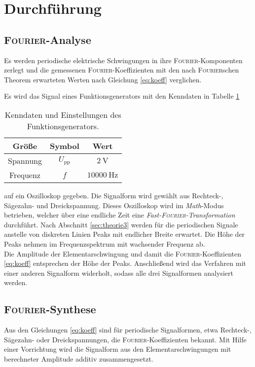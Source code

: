 \section{Durchführung}
\label{sec:Durchfuehrung}
\subsection{\textsc{Fourier}-Analyse}
Es werden periodische elektrische Schwingungen in ihre \textsc{Fourier}-Komponenten zerlegt und die gemessenen \textsc{Fourier}-Koeffizienten mit den nach \textsc{Fourier}schen Theorem erwarteten Werten nach Gleichung \ref{eq:koeff} verglichen.

Es wird das Signal eines Funktionsgenerators mit den Kenndaten in Tabelle \ref{tab:kenndaten}
\begin{table}
	\centering
	\begin{tabular}{ccc}
		\toprule
		{Größe}&{Symbol}&{Wert}\\
		\midrule
		{Spannung}&$U_\text{pp}$& $\SI{2}{\volt}$\\
		{Frequenz}&$f$& $\SI{10000}{\hertz}$\\
		\bottomrule
	\end{tabular}
	\caption{Kenndaten und Einstellungen des Funktionsgenerators.}
	\label{tab:kenndaten}
\end{table}
auf ein Oszilloskop gegeben.
Die Signalform wird gewählt aus Rechteck-, Sägezahn- und Dreickspannung.
Dieses Oszilloskop wird im \textit{Math}-Modus betrieben, welcher über eine endliche Zeit eine \textit{Fast-\textsc{Fourier}-Transformation} \cite{FFT} durchführt. 
Nach Abschnitt \ref{sec:theorie3} werden für die periodischen Signale anstelle von diskreten Linien Peaks mit endlicher Breite erwartet. 
Die Höhe der Peaks nehmen im Frequenzspektrum mit wachsender Frequenz ab.\\
Die Amplitude der Elementarschwingung und damit die \textsc{Fourier}-Koeffizienten \ref{eq:koeff} entsprechen der Höhe der Peaks. 
Anschließend wird das Verfahren mit einer anderen Signalform widerholt, sodass alle drei Signalformen analysiert werden.
%

\subsection{\textsc{Fourier}-Synthese}
Aus den Gleichungen \ref{eq:koeff} sind für periodische Signalformen, etwa Rechteck-, Sägezahn- oder Dreickspannungen, die \textsc{Fourier}-Koeffizienten bekannt. 
Mit Hilfe einer Vorrichtung wird die Signalform aus den Elementarschwingungen mit berechneter Amplitude additiv zusammengesetzt.

